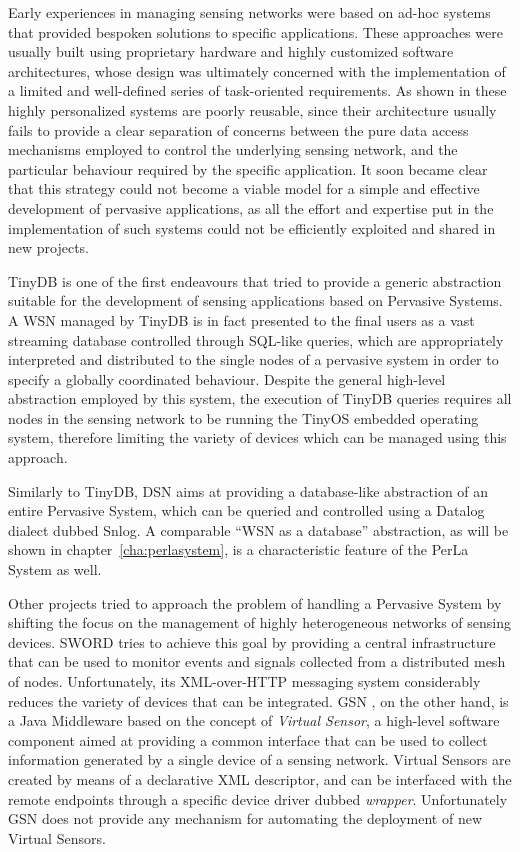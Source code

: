 Early experiences in managing sensing networks were based on ad-hoc systems
that provided bespoken solutions to specific applications. These approaches
were usually built using proprietary hardware and highly customized software
architectures, whose design was ultimately concerned with the implementation of
a limited and well-defined series of task-oriented requirements. As shown in
\cite{hartung2006firewxnet} \cite{mainwaring2002wireless}
\cite{werner2005monitoring} \cite{juang2002energy} these highly personalized
systems are poorly reusable, since their architecture usually fails to provide
a clear separation of concerns between the pure data access mechanisms employed
to control the underlying sensing network, and the particular behaviour
required by the specific application. It soon became clear that this strategy
could not become a viable model for a simple and effective development of
pervasive applications, as all the effort and expertise put in the
implementation of such systems could not be efficiently exploited and shared in
new projects.

TinyDB \cite{madden2005tinydb} is one of the first endeavours that tried to
provide a generic abstraction suitable for the development of sensing
applications based on Pervasive Systems. A WSN managed by TinyDB is in fact
presented to the final users as a vast streaming database controlled through
SQL-like queries, which are appropriately interpreted and distributed to the
single nodes of a pervasive system in order to specify a globally coordinated
behaviour. Despite the general high-level abstraction employed by this system,
the execution of TinyDB queries requires all nodes in the sensing network to be
running the TinyOS \cite{levis2005tinyos} embedded operating system, therefore
limiting the variety of devices which can be managed using this approach.

Similarly to TinyDB, DSN \cite{chu2006entirely} aims at providing a
database-like abstraction of an entire Pervasive System, which can be queried
and controlled using a Datalog dialect dubbed Snlog. A comparable ``WSN as a
database'' abstraction, as will be shown in chapter~\ref{cha:perlasystem}, is a
characteristic feature of the PerLa System as well.

Other projects tried to approach the problem of handling a Pervasive System by
shifting the focus on the management of highly heterogeneous networks of
sensing devices. SWORD \cite{sword} tries to achieve this goal by providing a
central infrastructure that can be used to monitor events and signals collected
from a distributed mesh of nodes. Unfortunately, its XML-over-HTTP messaging
system considerably reduces the variety of devices that can be integrated. GSN
\cite{aberer2006global}, on the other hand, is a Java Middleware based on the
concept of \textit{Virtual Sensor}, a high-level software component aimed at
providing a common interface that can be used to collect information generated
by a single device of a sensing network. Virtual Sensors are created by means
of a declarative XML descriptor, and can be interfaced with the remote
endpoints through a specific device driver dubbed \textit{wrapper}.
Unfortunately GSN does not provide any mechanism for automating the deployment
of new Virtual Sensors.

